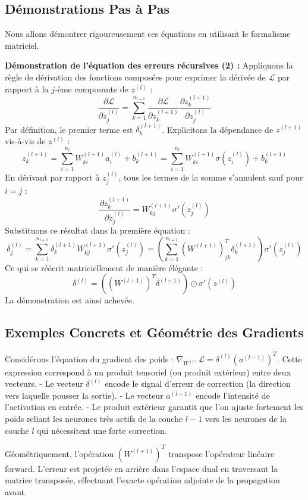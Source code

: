 \documentclass[11pt,a4paper]{article}
\begin{document}
\subsection{Démonstrations Pas à Pas}

Nous allons démontrer rigoureusement ces équations en utilisant le formalisme matriciel.

\textbf{Démonstration de l'équation des erreurs récursives (2) :}
Appliquons la règle de dérivation des fonctions composées pour exprimer la dérivée de $\mathcal{L}$ par rapport à la $j$-ème composante de $z^{(l)}$ :
$$ \frac{\partial \mathcal{L}}{\partial z^{(l)}_j} = \sum_{k=1}^{n_{l+1}} \frac{\partial \mathcal{L}}{\partial z^{(l+1)}_k} \frac{\partial z^{(l+1)}_k}{\partial z^{(l)}_j} $$
Par définition, le premier terme est $\delta^{(l+1)}_k$.
Explicitons la dépendance de $z^{(l+1)}$ vis-à-vis de $z^{(l)}$ :
$$ z^{(l+1)}_k = \sum_{i=1}^{n_l} W^{(l+1)}_{ki} a^{(l)}_i + b^{(l+1)}_k = \sum_{i=1}^{n_l} W^{(l+1)}_{ki} \sigma(z^{(l)}_i) + b^{(l+1)}_k $$
En dérivant par rapport à $z^{(l)}_j$, tous les termes de la somme s'annulent sauf pour $i=j$ :
$$ \frac{\partial z^{(l+1)}_k}{\partial z^{(l)}_j} = W^{(l+1)}_{kj} \sigma'(z^{(l)}_j) $$
Substituons ce résultat dans la première équation :
$$ \delta^{(l)}_j = \sum_{k=1}^{n_{l+1}} \delta^{(l+1)}_k W^{(l+1)}_{kj} \sigma'(z^{(l)}_j) = \left( \sum_{k=1}^{n_{l+1}} (W^{(l+1)})^T_{jk} \delta^{(l+1)}_k \right) \sigma'(z^{(l)}_j) $$
Ce qui se réécrit matriciellement de manière élégante :
$$ \delta^{(l)} = \left( (W^{(l+1)})^T \delta^{(l+1)} \right) \odot \sigma'(z^{(l)}) $$
La démonstration est ainsi achevée.

\subsection{Exemples Concrets et Géométrie des Gradients}

Considérons l'équation du gradient des poids : $\nabla_{W^{(l)}} \mathcal{L} = \delta^{(l)} (a^{(l-1)})^T$.
Cette expression correspond à un produit tensoriel (ou produit extérieur) entre deux vecteurs.
- Le vecteur $\delta^{(l)}$ encode le signal d'erreur de correction (la direction vers laquelle pousser la sortie).
- Le vecteur $a^{(l-1)}$ encode l'intensité de l'activation en entrée.
- Le produit extérieur garantit que l'on ajuste fortement les poids reliant les neurones très actifs de la couche $l-1$ vers les neurones de la couche $l$ qui nécessitent une forte correction.

Géométriquement, l'opération $(W^{(l+1)})^T$ transpose l'opérateur linéaire forward. L'erreur est projetée en arrière dans l'espace dual en traversant la matrice transposée, effectuant l'exacte opération adjointe de la propagation avant.
\end{document}
